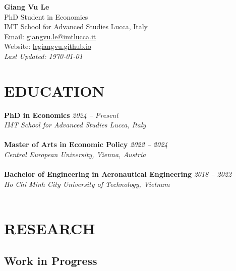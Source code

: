 \documentclass[11pt,a4paper]{article}
\newcommand{\entry}[4]{
  \noindent\textbf{#1} \hfill \textit{#2} \\
  \noindent\textit{#3} \\
  \noindent #4 \\[0.3cm]
}
\begin{document}
{\centering
\Huge\textbf{Giang Vu Le} \\
\vspace{0.2cm}
{\large PhD Student in Economics} \\
\vspace{0.2cm}
\normalsize
IMT School for Advanced Studies Lucca, Italy \\
Email: \href{mailto:giangvu.le@imtlucca.it}{giangvu.le@imtlucca.it} \\
Website: \href{https://legiangvu.github.io}{legiangvu.github.io} \\
\vspace{0.3cm}
}
\noindent\textit{Last Updated: \today} \\
\vspace{0.3cm}

\section*{EDUCATION}

\entry{PhD in Economics}{2024 -- Present}
{IMT School for Advanced Studies Lucca, Italy}
{}

\entry{Master of Arts in Economic Policy}{2022 -- 2024}
{Central European University, Vienna, Austria}
{}

\entry{Bachelor of Engineering in Aeronautical Engineering}{2018 -- 2022}
{Ho Chi Minh City University of Technology, Vietnam}
{}

\section*{RESEARCH}

\subsection*{Work in Progress}
\end{document}
